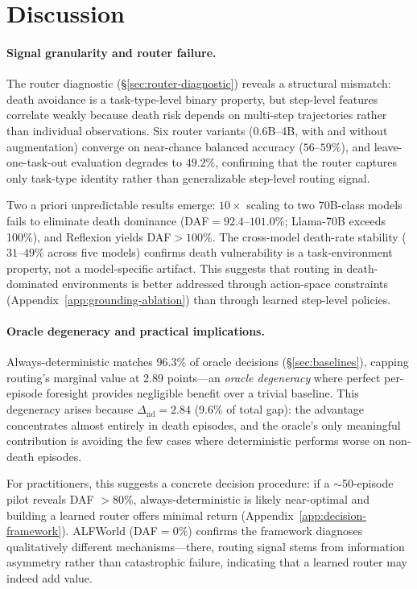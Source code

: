 \section{Discussion}
\label{sec:discussion}

\paragraph{Signal granularity and router failure.}
The router diagnostic (\S\ref{sec:router-diagnostic}) reveals a structural mismatch: death avoidance is a task-type-level binary property, but step-level features correlate weakly because death risk depends on multi-step trajectories rather than individual observations. Six router variants (0.6B--4B, with and without augmentation) converge on near-chance balanced accuracy ($56$--$59\%$), and leave-one-task-out evaluation degrades to $49.2\%$, confirming that the router captures only task-type identity rather than generalizable step-level routing signal.

Two a priori unpredictable results emerge: $10{\times}$ scaling to two 70B-class models fails to eliminate death dominance (DAF${}=92.4$--$101.0\%$; Llama-70B exceeds 100\%), and Reflexion yields DAF${}>100\%$. The cross-model death-rate stability ($31$--$49\%$ across five models) confirms death vulnerability is a task-environment property, not a model-specific artifact. This suggests that routing in death-dominated environments is better addressed through action-space constraints (Appendix~\ref{app:grounding-ablation}) than through learned step-level policies.

\paragraph{Oracle degeneracy and practical implications.}
Always-deterministic matches 96.3\% of oracle decisions (\S\ref{sec:baselines}), capping routing's marginal value at 2.89 points---an \emph{oracle degeneracy} where perfect per-episode foresight provides negligible benefit over a trivial baseline. This degeneracy arises because $\Delta_{\text{nd}} = 2.84$ (9.6\% of total gap): the advantage concentrates almost entirely in death episodes, and the oracle's only meaningful contribution is avoiding the few cases where deterministic performs worse on non-death episodes.

For practitioners, this suggests a concrete decision procedure: if a ${\sim}$50-episode pilot reveals DAF $> 80\%$, always-deterministic is likely near-optimal and building a learned router offers minimal return (Appendix~\ref{app:decision-framework}). ALFWorld (DAF${=}0\%$) confirms the framework diagnoses qualitatively different mechanisms---there, routing signal stems from information asymmetry rather than catastrophic failure, indicating that a learned router may indeed add value.

